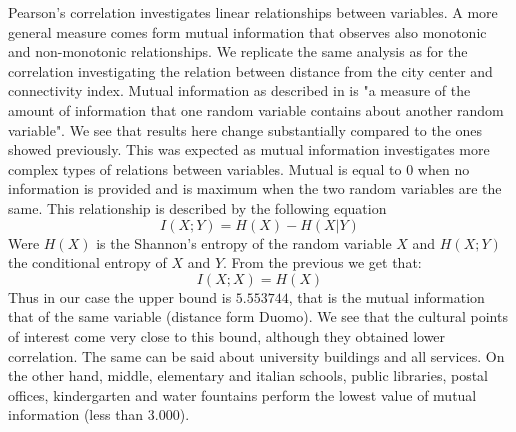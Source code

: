 \documentclass[11pt, titlepage]{article}
\begin{document}
Pearson's correlation investigates linear relationships between variables. A more general measure comes form mutual information that observes also monotonic and non-monotonic relationships. We replicate the same analysis as for the correlation investigating the relation between distance from the city center and connectivity index. Mutual information as described in \cite{elements} is "a measure of the amount of information that one random variable contains about another random variable". We see that results here change substantially compared to the ones showed previously. This was expected as mutual information investigates more complex types of relations between variables. Mutual is equal to 0 when no information is provided and is maximum when the two random variables are the same. This relationship is described by the following equation
\[I(X;Y)=H(X)-H(X|Y)\]
Were $H(X)$ is the Shannon's entropy of the random variable $X$ and $H(X;Y)$ the conditional entropy of $X$ and $Y$. From the previous we get that: 
\[I(X;X)=H(X)\]
Thus in our case the upper bound is $5.553744$, that is the mutual information that of the same variable (distance form Duomo). We see that the cultural points of interest come very close to this bound, although they obtained lower correlation. The same can be said about university buildings and all services. On the other hand, middle, elementary and italian schools, public libraries, postal offices, kindergarten and water fountains perform the lowest value of mutual information (less than $3.000$). 
\end{document}
